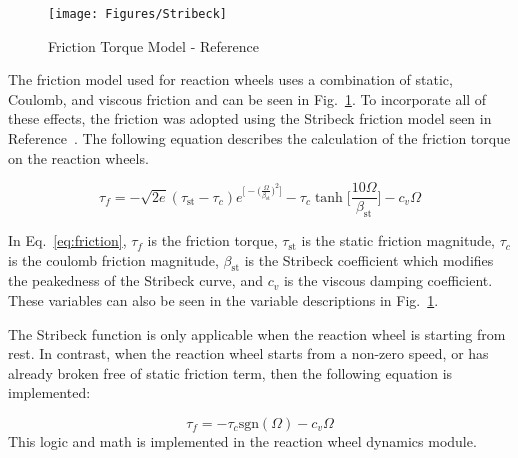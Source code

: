 \begin{figure}[htbp]
	\centerline{
		\texttt{[image: Figures/Stribeck]}}
	\caption{Friction Torque Model - Reference~\cite{OLSSON1998176}}
	\label{fig:Stribeck}
\end{figure}

The friction model used for reaction wheels uses a combination of static, Coulomb, and viscous friction and can be seen in Fig.~\ref{fig:Stribeck}. To incorporate all of these effects, the friction was adopted using the Stribeck friction model seen in Reference~\cite{OLSSON1998176}. The following equation describes the calculation of the friction torque on the reaction wheels.

\begin{equation}
\tau_{f} = - \sqrt{2 e} (\tau_{\text{st}}-\tau_c) e^{\Big[-\big(\frac{\Omega}{\beta_{\text{st}}}\big)^2\Big]} - \tau_c \tanh \Big[\frac{10 \Omega}{\beta_{\text{st}}}\Big] - c_v \Omega
\label{eq:friction}
\end{equation}

In Eq.~\eqref{eq:friction}, $\tau_{f}$ is the friction torque, $\tau_{\text{st}}$ is the static friction magnitude, $\tau_c$ is the coulomb friction magnitude, $\beta_{\text{st}}$ is the Stribeck coefficient which modifies the peakedness of the Stribeck curve, and $c_v$ is the viscous damping coefficient. These variables can also be seen in the variable descriptions in Fig.~\ref{fig:Stribeck}. 

The Stribeck function is only applicable when the reaction wheel is starting from rest. In contrast, when the reaction wheel starts from a non-zero speed, or has already broken free of static friction term, then the following equation is implemented:

\begin{equation}
\tau_{f} = - \tau_c \text{sgn} (\Omega) - c_v \Omega
\label{eq:friction2}
\end{equation}
This logic and math is implemented in the reaction wheel dynamics module. 
